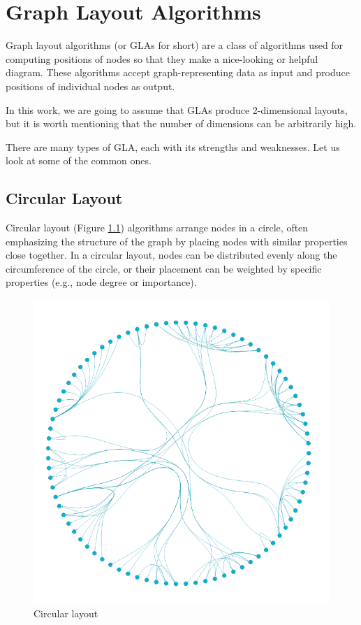 \chapter{Graph Layout Algorithms}
\label{chap:graph_layout_algorithms}

Graph layout algorithms (or \glspl{GLA} for short) are a class of algorithms used for computing positions
of nodes so that they make a nice-looking or helpful diagram.
These algorithms accept graph-representing data as input and produce positions of individual nodes as output.

In this work, we are going to assume that GLAs produce 2-dimensional layouts,
but it is worth mentioning that the number of dimensions can be arbitrarily high.

There are many types of GLA, each with its strengths and weaknesses.
Let us look at some of the common ones.

\section{Circular Layout}

Circular layout (Figure \ref{obr:graph_layout_circular}) algorithms arrange nodes in a circle, often emphasizing the structure of the graph by placing nodes
with similar properties close together.
In a circular layout, nodes can be distributed evenly along the circumference of the circle,
or their placement can be weighted by specific properties (e.g., node degree or importance).

\begin{figure}[p]\centering
    \includegraphics[width=140mm, keepaspectratio]{img/graph_layout_cicrular.png}
    \caption{Circular layout\cite{graph_layout_demos}}
    \label{obr:graph_layout_circular}
\end{figure}

